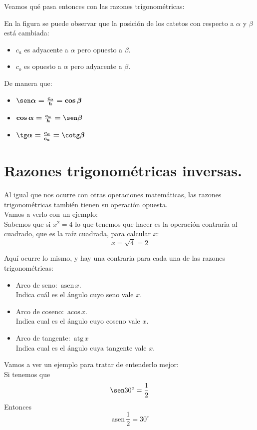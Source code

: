 \documentclass[a4paper,11pt,answers]{exam}
\newcommand{\degree}{^\circ}
\newcommand{\asen}{\,\mathrm{asen}\,}
\newcommand{\acos}{\,\mathrm{acos}\,}
\newcommand{\atg}{\,\mathrm{atg}\,}
\begin{document}
Veamos qué pasa entonces con las razones trigonométricas:
\vspace*{5mm}
\begin{center}
\end{center}

En la figura se puede observar que la posición de los catetos con respecto a $\alpha$ y $\beta$ está cambiada:
\begin{itemize}
\item $c_a$ es adyacente a $\alpha$ pero opuesto a $\beta$.
\item $c_o$ es opuesto a $\alpha$ pero adyacente a $\beta$.
\end{itemize}
De manera que:
\begin{itemize}
\item $\boldsymbol {\sen \alpha = \frac{c_o}{h} = \cos \beta}$
\item $\boldsymbol{\cos \alpha =  \frac{c_a}{h} = \sen \beta}$
\item $\boldsymbol{\tg \alpha = \frac{c_o}{c_a} = \cotg \beta}$
\end{itemize}
\section{Razones trigonométricas inversas.}
Al igual que nos ocurre con otras operaciones matemáticas, las razones trigonométricas también tienen su operación opuesta.\\
Vamos a verlo con un ejemplo:\\
Sabemos que si $x^2 = 4$ lo que tenemos que hacer es la operación contraria al cuadrado, que es la raíz cuadrada, para calcular $x$:
\[x = \sqrt{4} = 2\]

Aquí ocurre lo mismo, y hay una contraria para cada una de las razones trigonométricas:
\begin{itemize}
\item Arco de seno: $\asen x$.\\
  Indica cuál es el ángulo cuyo seno vale $x$.
\item Arco de coseno: $\acos x$.\\
  Indica cual es el ángulo cuyo coseno vale $x$.
\item Arco de tangente: $\atg x$\\
  Indica cual es el ángulo cuya tangente vale $x$.
\end{itemize}
Vamos a ver un ejemplo para tratar de entenderlo mejor:\\
Si tenemos que
\[\sen 30\degree = \frac{1}{2}\]
Entonces
\[\asen \frac{1}{2} = 30\degree\]
\end{document}
